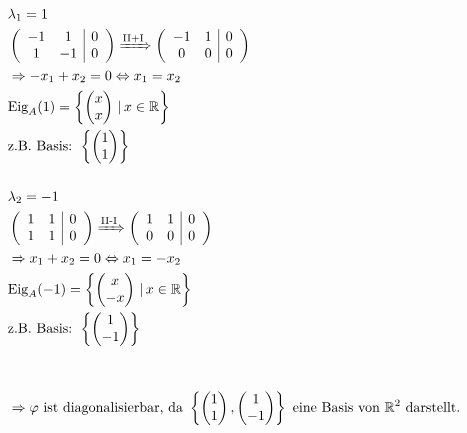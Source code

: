 \begin{align*}
    &\lambda _1 = 1 \\
    &\left(\begin{array}{cc|c}
        -1 & 1 & 0 \\
        1 & -1 & 0
    \end{array}\right) \xRightarrow{\text{II+I}} \left(\begin{array}{cc|c}
        -1 & 1 & 0 \\
        0 & 0 & 0
    \end{array}\right) \\
    &\Rightarrow - x_1 + x_2 = 0 \Leftrightarrow x_1 = x_2 \\
    &\text{Eig}_A(1) = \left\{\begin{pmatrix}x\\x\end{pmatrix}\,|\,x \in \mathbb{R}\right\} \\
    &\text{z.B. Basis: } \left\{\begin{pmatrix}1\\1\end{pmatrix}\right\} \\[0.5cm]
    &\lambda _2 = -1 \\
    &\left(\begin{array}{cc|c}
        1 & 1 & 0 \\
        1 & 1 & 0
    \end{array}\right) \xRightarrow{\text{II-I}} \left(\begin{array}{cc|c}
        1 & 1 & 0 \\
        0 & 0 & 0
    \end{array}\right) \\
    &\Rightarrow x_1 + x_2 = 0 \Leftrightarrow x_1 = -x_2 \\
    &\text{Eig}_A(-1) = \left\{\begin{pmatrix}x\\-x\end{pmatrix}\,|\,x \in \mathbb{R}\right\} \\
    &\text{z.B. Basis: } \left\{\begin{pmatrix}1\\-1\end{pmatrix}\right\} \\[1cm]
    &\Rightarrow \varphi \text{ ist diagonalisierbar, da } \left\{\begin{pmatrix}1\\1\end{pmatrix},\begin{pmatrix}1\\-1\end{pmatrix}\right\} \text{ eine Basis von } \mathbb{R}^2 \text{ darstellt.}
\end{align*}

